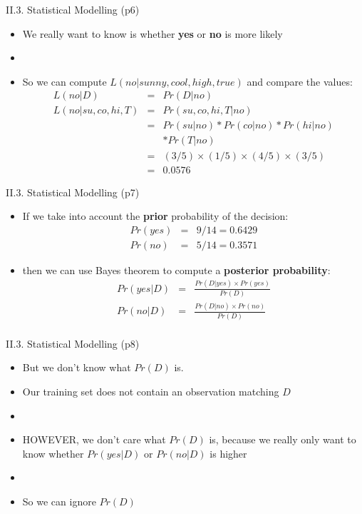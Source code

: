 \documentclass[handout]{beamer}
\begin{document}
\begin{frame}{II.3. Statistical Modelling (p6)}
\begin{itemize}
\item We really want to know is whether \textbf{yes} or \textbf{no} is more likely
\item[]
\item So we can compute $L( no | sunny, cool, high, true )$ and compare the values:
\[
\begin{array}{rcl}
	L( no | D ) & = & Pr( D | no ) \\
	L( no | su, co, hi, T ) & = & Pr( su, co, hi, T | no ) \\
		& = & Pr( su | no ) * Pr( co | no ) * Pr( hi | no ) \\
		&   & * Pr( T | no ) \\
		& = & (3/5) \times (1/5) \times (4/5) \times (3/5) \\
		& = & 0.0576
\end{array}
\]
\end{itemize}
\end{frame}
\begin{frame}{II.3. Statistical Modelling (p7)}
\begin{itemize}
\item If we take into account the \textbf{prior} probability of the decision:
\begin{eqnarray*}
Pr(yes) & = & 9/14 = 0.6429\\
Pr(no)  & = & 5/14 = 0.3571
\end{eqnarray*}
\item[] then we can use Bayes theorem to compute a \textbf{posterior probability}:
\begin{eqnarray*}
Pr(yes|D) & = & \frac{ Pr(D|yes) \times Pr(yes) }{ Pr(D) } \\
Pr(no|D)  & = & \frac{ Pr(D|no) \times Pr(no) }{ Pr(D) } \\
\end{eqnarray*}
\end{itemize}
\end{frame}
\begin{frame}{II.3. Statistical Modelling (p8)}
\begin{itemize}
\item But we don't know what $Pr(D)$ is.
\item[] Our training set does not contain an observation matching $D$
\item[]
\item HOWEVER, we don't care what $Pr(D)$ is, 
because we really only want to know whether $Pr(yes|D)$ or $Pr(no|D)$ is higher
\item[]
\item So we can ignore $Pr(D)$ 
\end{itemize}
\end{frame}
\end{document}
